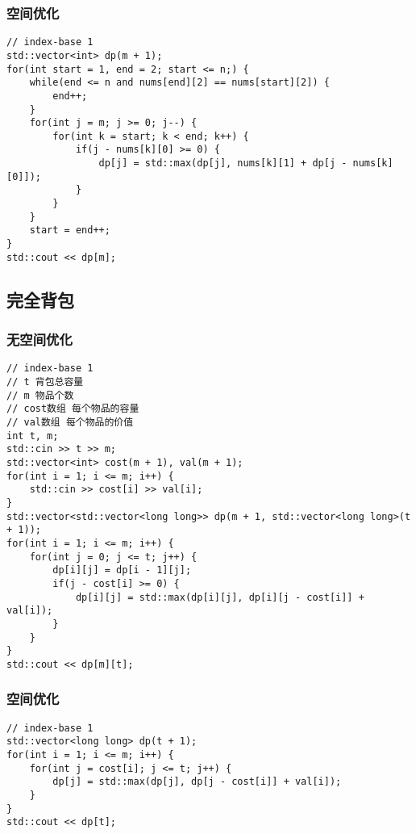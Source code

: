 \subsubsection{空间优化}
\begin{lstlisting}
// index-base 1
std::vector<int> dp(m + 1);
for(int start = 1, end = 2; start <= n;) {
    while(end <= n and nums[end][2] == nums[start][2]) {
        end++;
    }
    for(int j = m; j >= 0; j--) {
        for(int k = start; k < end; k++) {
            if(j - nums[k][0] >= 0) {
                dp[j] = std::max(dp[j], nums[k][1] + dp[j - nums[k][0]]);
            }
        }
    }
    start = end++;
}
std::cout << dp[m];
\end{lstlisting}

\subsection{完全背包}

\subsubsection{无空间优化}
\begin{lstlisting}
// index-base 1
// t 背包总容量
// m 物品个数
// cost数组 每个物品的容量
// val数组 每个物品的价值
int t, m;
std::cin >> t >> m;
std::vector<int> cost(m + 1), val(m + 1);
for(int i = 1; i <= m; i++) {
    std::cin >> cost[i] >> val[i];
}
std::vector<std::vector<long long>> dp(m + 1, std::vector<long long>(t + 1));
for(int i = 1; i <= m; i++) {
    for(int j = 0; j <= t; j++) {
        dp[i][j] = dp[i - 1][j];
        if(j - cost[i] >= 0) {
            dp[i][j] = std::max(dp[i][j], dp[i][j - cost[i]] + val[i]);
        }
    }
}
std::cout << dp[m][t];
\end{lstlisting}

\subsubsection{空间优化}
\begin{lstlisting}
// index-base 1
std::vector<long long> dp(t + 1);
for(int i = 1; i <= m; i++) {
    for(int j = cost[i]; j <= t; j++) {
        dp[j] = std::max(dp[j], dp[j - cost[i]] + val[i]);
    }
}
std::cout << dp[t];
\end{lstlisting}